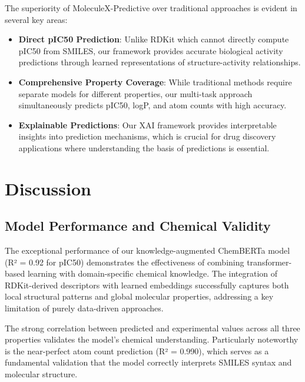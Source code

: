 \documentclass[preprint,12pt]{elsarticle}
\begin{document}
The superiority of MoleculeX-Predictive over traditional approaches is evident in several key areas:

\begin{itemize}
\item \textbf{Direct pIC50 Prediction}: Unlike RDKit which cannot directly compute pIC50 from SMILES, our framework provides accurate biological activity predictions through learned representations of structure-activity relationships.
\item \textbf{Comprehensive Property Coverage}: While traditional methods require separate models for different properties, our multi-task approach simultaneously predicts pIC50, logP, and atom counts with high accuracy.
\item \textbf{Explainable Predictions}: Our XAI framework provides interpretable insights into prediction mechanisms, which is crucial for drug discovery applications where understanding the basis of predictions is essential.
\end{itemize}


\clearpage
\section{Discussion}
\label{sec:discussion}

\subsection{Model Performance and Chemical Validity}

The exceptional performance of our knowledge-augmented ChemBERTa model (R² = 0.92 for pIC50) demonstrates the effectiveness of combining transformer-based learning with domain-specific chemical knowledge. The integration of RDKit-derived descriptors with learned embeddings successfully captures both local structural patterns and global molecular properties, addressing a key limitation of purely data-driven approaches.

The strong correlation between predicted and experimental values across all three properties validates the model's chemical understanding. Particularly noteworthy is the near-perfect atom count prediction (R² = 0.990), which serves as a fundamental validation that the model correctly interprets SMILES syntax and molecular structure.
\end{document}
